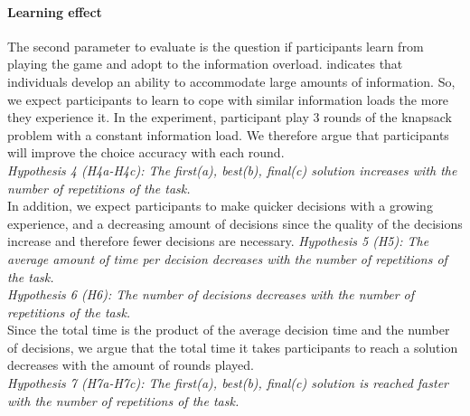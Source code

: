 \paragraph{Learning effect}
The second parameter to evaluate is the question if participants learn from playing the game and adopt to the information overload. \cite{Jacoby1974} indicates that individuals develop an ability to accommodate large amounts of information. So, we expect participants to learn to cope with similar information loads the more they experience it. In the experiment, participant play 3 rounds of the knapsack problem with a constant information load. We therefore argue that participants will improve the choice accuracy with each round.\\
\textit{Hypothesis 4 (H4a-H4c): The first(a), best(b), final(c) solution increases with the number of repetitions of the task. }\\
In addition, we expect participants to make quicker decisions with a growing experience, and a decreasing amount of decisions since the quality of the decisions increase and therefore fewer decisions are necessary. 
\textit{Hypothesis 5 (H5): The average amount of time per decision decreases with the number of repetitions of the task. }\\
\textit{Hypothesis 6 (H6): The number of decisions decreases with the number of repetitions of the task. }\\
Since the total time is the product of the average decision time and the number of decisions, we argue that the total time it takes participants to reach a solution decreases with the amount of rounds played.\\
\textit{Hypothesis 7 (H7a-H7c): The first(a), best(b), final(c) solution is reached faster with the number of repetitions of the task. }

